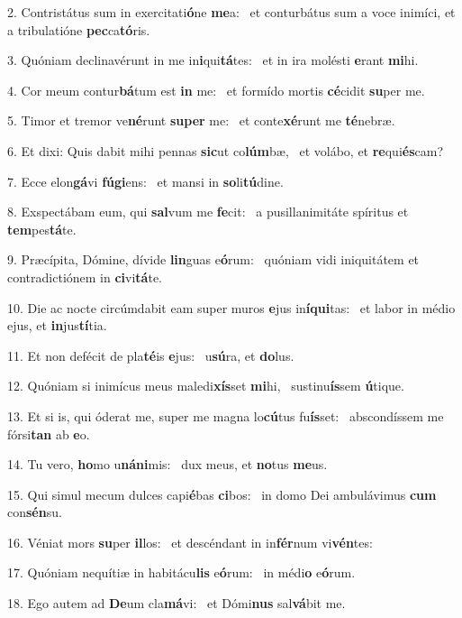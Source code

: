 2. Contristátus sum in exercitati\textbf{ó}ne \textbf{me}a: \ast\  et conturbátus sum a voce inimíci, et a tribulatióne \textbf{pec}ca\textbf{tó}ris.\

3. Quóniam declinavérunt in me in\textbf{i}qui\textbf{tá}tes: \ast\  et in ira molésti \textbf{e}rant \textbf{mi}hi.\

4. Cor meum contur\textbf{bá}tum est \textbf{in} me: \ast\  et formído mortis \textbf{cé}cidit \textbf{su}per me.\

5. Timor et tremor ve\textbf{né}runt \textbf{su}\textbf{per} me: \ast\  et conte\textbf{xé}runt me \textbf{té}nebræ.\

6. Et dixi: Quis dabit mihi pennas \textbf{sic}ut co\textbf{lúm}bæ, \ast\  et volábo, et \textbf{re}qui\textbf{és}cam?\

7. Ecce elon\textbf{gá}vi \textbf{fú}\textbf{gi}ens: \ast\  et mansi in \textbf{so}li\textbf{tú}dine.\

8. Exspectábam eum, qui \textbf{sal}vum me \textbf{fe}cit: \ast\  a pusillanimitáte spíritus et \textbf{tem}pes\textbf{tá}te.\

9. Præcípita, Dómine, dívide \textbf{lin}guas e\textbf{ó}rum: \ast\  quóniam vidi iniquitátem et contradictiónem in \textbf{ci}vi\textbf{tá}te.\

10. Die ac nocte circúmdabit eam super muros \textbf{e}jus in\textbf{í}\textbf{qui}tas: \ast\  et labor in médio ejus, et \textbf{in}jus\textbf{tí}tia.\

11. Et non defécit de pla\textbf{té}is \textbf{e}jus: \ast\  u\textbf{sú}ra, et \textbf{do}lus.\

12. Quóniam si inimícus meus maledi\textbf{xís}set \textbf{mi}hi, \ast\  sustinu\textbf{ís}sem \textbf{ú}tique.\

13. Et si is, qui óderat me, super me magna lo\textbf{cú}tus fu\textbf{ís}set: \ast\  abscondíssem me fórsi\textbf{tan} ab \textbf{e}o.\

14. Tu vero, \textbf{ho}mo u\textbf{ná}\textbf{ni}mis: \ast\  dux meus, et \textbf{no}tus \textbf{me}us.\

15. Qui simul mecum dulces capi\textbf{é}bas \textbf{ci}bos: \ast\  in domo Dei ambulávimus \textbf{cum} con\textbf{sén}su.\

16. Véniat mors \textbf{su}per \textbf{il}los: \ast\  et descéndant in in\textbf{fér}num vi\textbf{vén}tes:\

17. Quóniam nequítiæ in habitácu\textbf{lis} e\textbf{ó}rum: \ast\  in médi\textbf{o} e\textbf{ó}rum.\

18. Ego autem ad \textbf{De}um cla\textbf{má}vi: \ast\  et Dómi\textbf{nus} sal\textbf{vá}bit me.\

